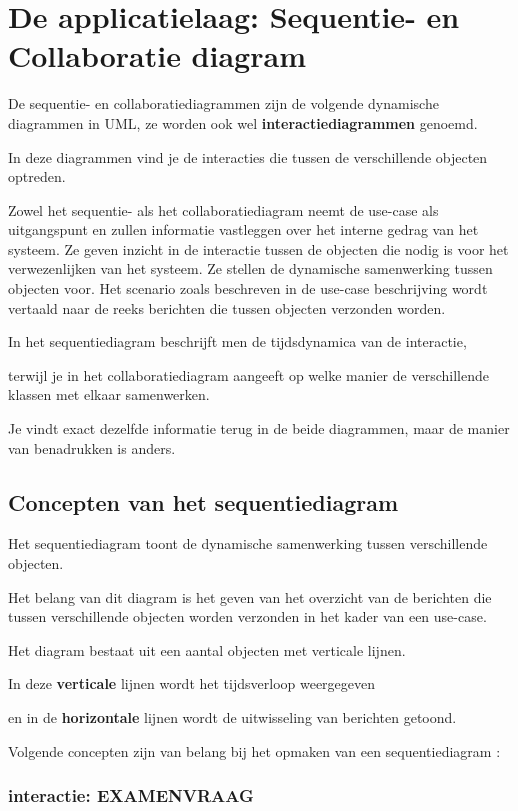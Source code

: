 \section{De applicatielaag: Sequentie- en Collaboratie diagram}

De sequentie- en collaboratiediagrammen zijn de volgende dynamische diagrammen in UML, ze worden ook wel \textbf{interactiediagrammen} genoemd. 

In deze diagrammen vind je de interacties die tussen de verschillende objecten optreden.

Zowel het sequentie- als het collaboratiediagram neemt de use-case als uitgangspunt en zullen informatie vastleggen over het interne gedrag van het systeem. Ze geven inzicht in de interactie tussen de objecten die nodig is voor het verwezenlijken van het systeem. Ze stellen de dynamische samenwerking tussen objecten voor. Het scenario zoals beschreven in de use-case beschrijving wordt vertaald naar de reeks berichten die tussen objecten verzonden worden.

In het sequentiediagram beschrijft men de tijdsdynamica van de interactie, 

terwijl je in het collaboratiediagram aangeeft op welke manier de verschillende klassen met elkaar samenwerken. 

Je vindt exact dezelfde informatie terug in de beide diagrammen, maar de manier van benadrukken is anders.

\subsection{Concepten van het sequentiediagram}
Het sequentiediagram toont de dynamische samenwerking tussen verschillende objecten.

Het belang van dit diagram is het geven van het overzicht van de berichten die tussen verschillende objecten worden verzonden in het kader van een use-case. 

Het diagram bestaat uit een aantal objecten met verticale lijnen.

In deze \textbf{verticale} lijnen wordt het tijdsverloop weergegeven 

en in de \textbf{horizontale} lijnen wordt de uitwisseling van berichten getoond.

Volgende concepten zijn van belang bij het opmaken van een sequentiediagram :

\subsubsection{interactie: EXAMENVRAAG}

